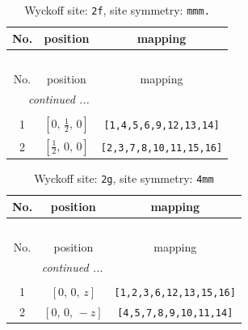 \documentclass[fleqn,8pt]{jsarticle}
\begin{document}
\renewcommand{\arraystretch}{1.2}
\begin{longtable}{ccc}
\caption{Wyckoff site: {\tt 2f}, site symmetry: {\tt mmm.}}
 \\
 \hline \hline
No. & position & mapping \\ \hline \endfirsthead

\multicolumn{2}{l}{\tablename\ \thetable{}} \\
 \hline \hline
No. & position & mapping \\ \hline \endhead

 \hline \hline
\multicolumn{2}{r}{\footnotesize\it continued ...} \\ \endfoot

 \hline \hline
\multicolumn{2}{r}{} \\ \endlastfoot

1 & $\left[ 0,\, \frac{1}{2},\, 0 \right]$ & {\tt [1,4,5,6,9,12,13,14]} \\ \hline
2 & $\left[ \frac{1}{2},\, 0,\, 0 \right]$ & {\tt [2,3,7,8,10,11,15,16]} \\
\end{longtable}
\renewcommand{\arraystretch}{1.2}
\begin{longtable}{ccc}
\caption{Wyckoff site: {\tt 2g}, site symmetry: {\tt 4mm}}
 \\
 \hline \hline
No. & position & mapping \\ \hline \endfirsthead

\multicolumn{2}{l}{\tablename\ \thetable{}} \\
 \hline \hline
No. & position & mapping \\ \hline \endhead

 \hline \hline
\multicolumn{2}{r}{\footnotesize\it continued ...} \\ \endfoot

 \hline \hline
\multicolumn{2}{r}{} \\ \endlastfoot

1 & $\left[ 0,\, 0,\, z \right]$ & {\tt [1,2,3,6,12,13,15,16]} \\ \hline
2 & $\left[ 0,\, 0,\, - z \right]$ & {\tt [4,5,7,8,9,10,11,14]} \\
\end{longtable}
\renewcommand{\arraystretch}{1.2}
\end{document}
